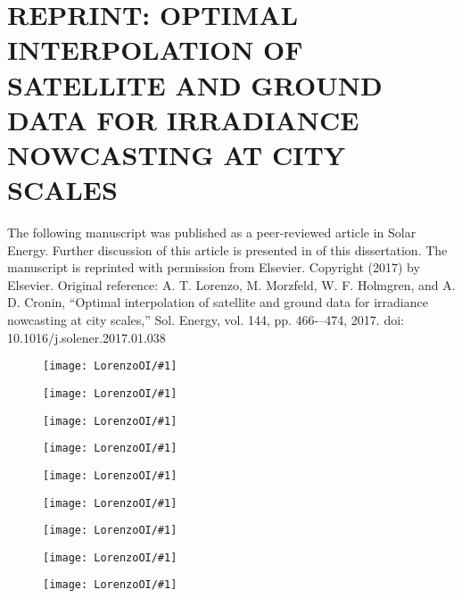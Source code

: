 \chapter{REPRINT: OPTIMAL INTERPOLATION OF SATELLITE AND GROUND DATA
  FOR IRRADIANCE NOWCASTING AT CITY SCALES}
\label{app:satoi}

The following manuscript was published as a peer-reviewed article in
Solar Energy.
Further discussion of this article is presented in 
of this dissertation.
The manuscript is reprinted with permission from Elsevier.
Copyright (2017) by Elsevier.
Original reference:
A. T. Lorenzo, M. Morzfeld, W. F. Holmgren, and A. D. Cronin, ``Optimal
interpolation of satellite and ground data for irradiance nowcasting
at city scales,'' Sol. Energy, vol. 144, pp. 466-–474, 2017. doi:
10.1016/j.solener.2017.01.038

\newcommand{\figOI}[1]{
\begin{figure}
\texttt{[image: LorenzoOI/\#1]}
\end{figure}
}


\figOI{pg1}
\figOI{pg2}
\figOI{pg3}
\figOI{pg4}
\figOI{pg5}
\figOI{pg6}
\figOI{pg7}
\figOI{pg8}
\figOI{pg9}

